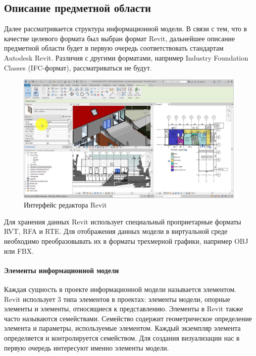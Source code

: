 ﻿\subsection{Описание предметной области}

Далее рассматривается структура информационной модели.
В связи с тем, что в качестве целевого формата был выбран  формат Revit,
дальнейшее описание предметной области будет в первую очередь
соответствовать стандартам Autodesk Revit.
Различия с другими форматами, например Industry Foundation Classes (IFC-формат),%
\cite{BuildingSmartIFC}
рассматриваться не будут.

\begin{figure}[h]
    \includegraphics[width=\textwidth]{images/Revit-interface.jpg}
    \caption{Интерфейс редактора Revit}
    \label{figure:RevitInterface}
\end{figure}

Для хранения данных Revit использует специальный проприетарные форматы RVT, RFA и RTE.
Для отображения данных модели в виртуальной среде необходимо
преобразовывать их в форматы трехмерной графики, например OBJ или FBX.

\paragraph{Элементы информационной модели}

Каждая сущность в проекте информационной модели называется элементом.
Revit использует 3 типа элементов в проектах:
элементы модели, опорные элементы и элементы, относящиеся к представлению.
Элементы в Revit также часто называются семействами.
Семейство содержит геометрическое определение элемента и
параметры, используемые элементом.
Каждый экземпляр элемента определяется и контролируется семейством.%
\cite{DocRevit}
Для создания визуализации нас в первую очередь интересуют
именно элементы модели.

